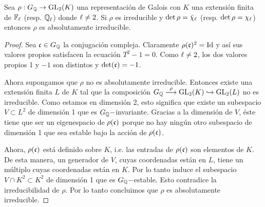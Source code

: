 \documentclass[../../tesis_maestria]{subfiles}
\begin{document}
\begin{prop}\label{prop:irred_equiv_absirred}
  Sea $\rho:G_{\mathbb{Q}}\rightarrow\mathrm{GL}_2(K)$ una representaci\'on de Galois con $K$ una extensi\'on finita de $\mathbb{F}_\ell$ (resp. $\mathbb{Q}_\ell$) donde $\ell\neq2$. Si $\rho$ es irreducible y $\det\rho=\bar{\chi}_\ell$ (resp. $\det\rho=\chi_\ell$) entonces $\rho$ es absolutamente irreducible.
\end{prop}
\begin{proof}
  Sea $\mathfrak{c}\in G_{\mathbb{Q}}$ la conjugaci\'on compleja. Claramente $\rho(\mathfrak{c})^2=\mathrm{Id}$ y as\'i sus valores propios satisfacen la ecuaci\'on $T^2-1=0$. Como $\ell\neq2$, los dos valores propios 1 y $-1$ son distintos y $\det(\mathfrak{c})=-1$.
  
  Ahora supongamos que $\rho$ no es absolutamente irreducible. Entonces existe una extensi\'on finita $L$ de $K$ tal que la composici\'on $G_{\mathbb{Q}}\overset{\rho}{\longrightarrow}\mathrm{GL}_2(K)\hookrightarrow\mathrm{GL}_2(L)$ no es irreducible. Como estamos en dimensi\'on 2, esto significa que existe un subespacio $V\subset L^2$ de dimensi\'on 1 que es $G_{\mathbb{Q}}-$invariante. Gracias a la dimensi\'on de $V$, \'este tiene que ser un eigenespacio de $\rho(\mathfrak{c})$ porque no hay ning\'un otro subespacio de dimensi\'on 1 que sea estable bajo la acci\'on de $\rho(\mathfrak{c})$.

  Ahora, $\rho(\mathfrak{c})$ est\'a definido sobre $K$, i.e. las entradas de $\rho(\mathfrak{c})$ son elementos de $K$. De esta manera, un generador de $V$, cuyas coordenadas est\'an en $L$, tiene un m\'ultiplo cuyas coordenadas est\'an en $K$. Por lo tanto induce el subespacio $V\cap K^2\subset K^2$ de dimensi\'on 1 que es $G_{\mathbb{Q}}-$estable. Esto contradice la irreducibilidad de $\rho$. Por lo tanto concluimos que $\rho$ es absolutamente irreducible.
\end{proof}
\end{document}

